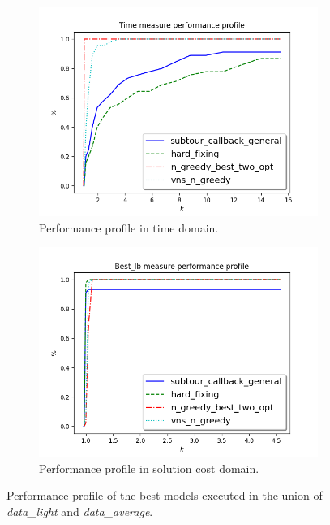 \begin{figure}[!h]
	\centering
	\begin{subfigure}{.49\textwidth}
		\centering
		\includegraphics[width=\columnwidth]{../res/Lbest_time.png}
		\caption{Performance profile in time domain.}
		\label{fig:Lbest_time}
	\end{subfigure}
\hfill
	\begin{subfigure}{.49\textwidth}
		\centering
		\includegraphics[width=\columnwidth]{../res/Lbest_lb.png}
		\caption{Performance profile in solution cost domain.}
		\label{fig:Lbest_lb}
	\end{subfigure}
	\caption{Performance profile of the best models executed in the union of \textit{data\_light} and \textit{data\_average}.}
	\label{fig:pp_Lbest}
\end{figure}